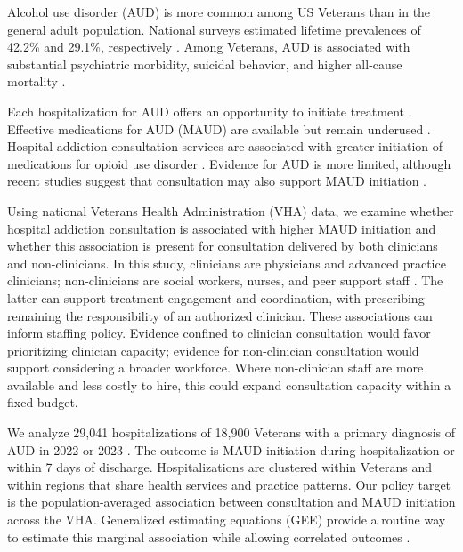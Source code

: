 \documentclass[12pt]{article}
\theoremstyle{remark}
\begin{document}
Alcohol use disorder (AUD) is more common among US Veterans than in the general
adult population. National surveys estimated lifetime prevalences of 42.2\%
and 29.1\%, respectively \citep{fuehrlein2016burden,grant2015epidemiology}.
Among Veterans, AUD is associated with substantial psychiatric morbidity, suicidal behavior,
and higher all-cause mortality
\citep{fuehrlein2016burden,chwastiak2010association}.

Each hospitalization for AUD offers an opportunity to initiate
treatment \citep{joudrey2020inpatient}. Effective medications for AUD (MAUD)
are available but remain underused \citep{mason2022looking}. Hospital addiction
consultation services are associated with greater initiation of medications
for opioid use disorder \citep{danovitch2024addiction,ober2025hospital}.
Evidence for AUD is more limited, although recent studies suggest that
consultation may also support MAUD initiation
\citep{singhtan2023addiction,anderson2026initiation}.

Using national Veterans Health Administration (VHA) data, we examine whether
hospital addiction consultation is associated with higher MAUD initiation and
whether this association is present for consultation delivered by both
clinicians and non-clinicians. In this study, clinicians are physicians and
advanced practice clinicians; non-clinicians are social workers, nurses, and
peer support staff \citep{anderson2026initiation}. The latter can support
treatment engagement and coordination, with prescribing remaining the
responsibility of an authorized clinician. These associations can inform
staffing policy. Evidence confined to clinician consultation would favor
prioritizing clinician capacity; evidence for non-clinician consultation would
support considering a broader workforce. Where non-clinician staff are more
available and less costly to hire, this could expand consultation capacity
within a fixed budget.

We analyze 29{,}041 hospitalizations of 18{,}900 Veterans with a primary
diagnosis of AUD in 2022 or 2023 \citep{anderson2026initiation}. The outcome is
MAUD initiation during hospitalization or within 7 days of discharge.
Hospitalizations are clustered within Veterans and within regions that share
health services and practice patterns. Our policy target is the
population-averaged association between consultation and MAUD initiation across
the VHA. Generalized estimating equations (GEE) provide a routine way to
estimate this marginal association while allowing correlated outcomes
\citep{liang1986longitudinal,zeger1988models}.
\end{document}
